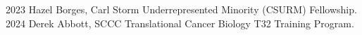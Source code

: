 2023 \hspace{60pt} Hazel Borges, Carl Storm Underrepresented Minority (CSURM) Fellowship. \\
2024 \hspace{60pt} Derek Abbott, SCCC Translational Cancer Biology T32 Training Program. 


